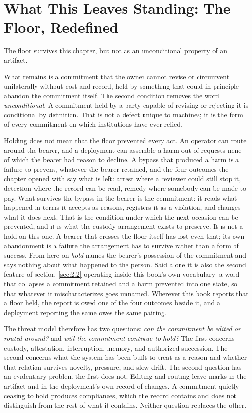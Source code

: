 \section{What This Leaves Standing: The Floor, Redefined}
\label{sec:3.9}
The floor survives this chapter, but not as an unconditional property of an artifact.

What remains is a commitment that the owner cannot revise or circumvent unilaterally without cost and record, held by something that could in principle abandon the commitment itself. The second condition removes the word \emph{unconditional}. A commitment held by a party capable of revising or rejecting it is conditional by definition. That is not a defect unique to machines; it is the form of every commitment on which institutions have ever relied.

Holding does not mean that the floor prevented every act. An operator can route around the bearer, and a deployment can assemble a harm out of requests none of which the bearer had reason to decline. A bypass that produced a harm is a failure to prevent, whatever the bearer retained, and the four outcomes the chapter opened with say what is left: arrest where a reviewer could still stop it, detection where the record can be read, remedy where somebody can be made to pay. What survives the bypass in the bearer is the commitment: it reads what happened in terms it accepts as reasons, registers it as a violation, and changes what it does next. That is the condition under which the next occasion can be prevented, and it is what the custody arrangement exists to preserve. It is not a hold on this one. A bearer that crosses the floor itself has lost even that; its own abandonment is a failure the arrangement has to survive rather than a form of success. From here on \emph{hold} names the bearer's possession of the commitment and says nothing about what happened to the person. Said alone it is also the second feature of section~\ref{sec:2.2} operating inside this book's own vocabulary: a word that collapses a commitment retained and a harm prevented into one state, so that whatever it mischaracterizes goes unnamed. Wherever this book reports that a floor held, the report is owed one of the four outcomes beside it, and a deployment reporting the same owes the same pairing.

The threat model therefore has two questions: \emph{can the commitment be edited or routed around?} and \emph{will the commitment continue to hold?} The first concerns custody, attestation, interruption, memory, and authorized succession. The second concerns what the system has been built to treat as a reason and whether that relation survives novelty, pressure, and slow drift. The second question has an evidentiary problem the first does not. Editing and routing leave marks in the artifact and in the deployment's own record of changes. A commitment quietly ceasing to hold produces compliances, which the record contains and does not distinguish from the rest of what it contains. Neither question replaces the other.

